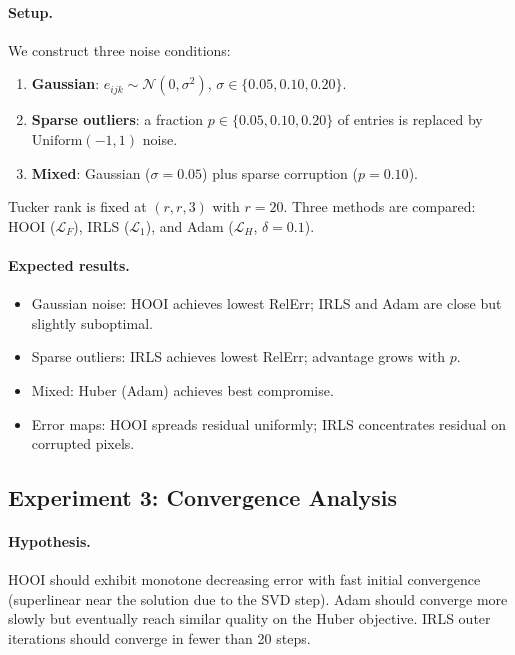 \paragraph{Setup.}
We construct three noise conditions:
\begin{enumerate}
  \item \textbf{Gaussian}: $e_{ijk} \sim \mathcal{N}(0, \sigma^2)$,
        $\sigma \in \{0.05, 0.10, 0.20\}$.
  \item \textbf{Sparse outliers}: a fraction $p \in \{0.05, 0.10, 0.20\}$
        of entries is replaced by $\mathrm{Uniform}(-1, 1)$ noise.
  \item \textbf{Mixed}: Gaussian ($\sigma = 0.05$) plus sparse corruption
        ($p = 0.10$).
\end{enumerate}
Tucker rank is fixed at $(r, r, 3)$ with $r = 20$.
Three methods are compared: HOOI ($\mathcal{L}_F$), IRLS ($\mathcal{L}_1$),
and Adam ($\mathcal{L}_H$, $\delta = 0.1$).

\paragraph{Expected results.}
\begin{itemize}
  \item Gaussian noise: HOOI achieves lowest RelErr; IRLS and Adam are
        close but slightly suboptimal.
  \item Sparse outliers: IRLS achieves lowest RelErr; advantage grows
        with $p$.
  \item Mixed: Huber (Adam) achieves best compromise.
  \item Error maps: HOOI spreads residual uniformly; IRLS concentrates
        residual on corrupted pixels.
\end{itemize}

\subsection{Experiment 3: Convergence Analysis}
\label{subsec:exp_convergence}

\paragraph{Hypothesis.}
HOOI should exhibit monotone decreasing error with fast initial convergence
(superlinear near the solution due to the SVD step).
Adam should converge more slowly but eventually reach similar quality
on the Huber objective.
IRLS outer iterations should converge in fewer than 20 steps.

